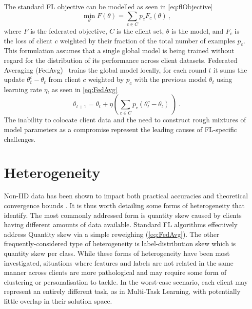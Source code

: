 The standard FL objective can be modelled as seen in \cref{eq:flObjective}
\begin{equation} \label{eq:flObjective}
    \underset{\theta}{\min} F(\theta) = \sum_{c \in C} p_c F_c(\theta) \ ,
\end{equation}
where \(F\) is the federated objective, $C$ is the client set, $\theta$ is the model, and \(F_c\) is the loss of client \(c\) weighted by their fraction of the total number of examples $p_c$. This formulation assumes that a single global model is being trained without regard for the distribution of its performance across client datasets. Federated Averaging (FedAvg)~\citep{FedAvg} trains the global model locally, for each round $t$ it sums the update \(\theta_t^c - \theta_t\) from client $c$ weighted by \(p_c\) with the previous model \(\theta_t\) using learning rate \( \eta \), as seen in \cref{eq:FedAvg}
\begin{equation} \label{eq:FedAvg}
    \theta_{t+1} = \theta_t + \eta \left( \sum_{c \in C} p_c \left(\theta_t^c - \theta_t \right) \ \right) \ .
\end{equation}
The inability to colocate client data and the need to construct rough mixtures of model parameters as a compromise represent the leading causes of FL-specific challenges.

\section{Heterogeneity}\label{background:data_heterogeneity}

Non-IID data has been shown to impact both practical accuracies \citep{FLwithNonIID, NonIIDQagmire} and theoretical convergence bounds \citep{OnTheConvergenceOfFedAvgOnNonIIDdata}. It is thus worth detailing some forms of heterogeneity that \citet{AdvancedAndOpenProblems} identify. The most commonly addressed form is quantity skew caused by clients having different amounts of data available. Standard FL algorithms effectively address Quantity skew via a simple reweighing (\cref{eq:FedAvg}). The other frequently-considered type of heterogeneity is label-distribution skew which is quantity skew per class. While these forms of heterogeneity have been most investigated, situations where features and labels are not related in the same manner across clients are more pathological and may require some form of clustering or personalisation to tackle. In the worst-case scenario, each client may represent an entirely different task, as in Multi-Task Learning, with potentially little overlap in their solution space.


